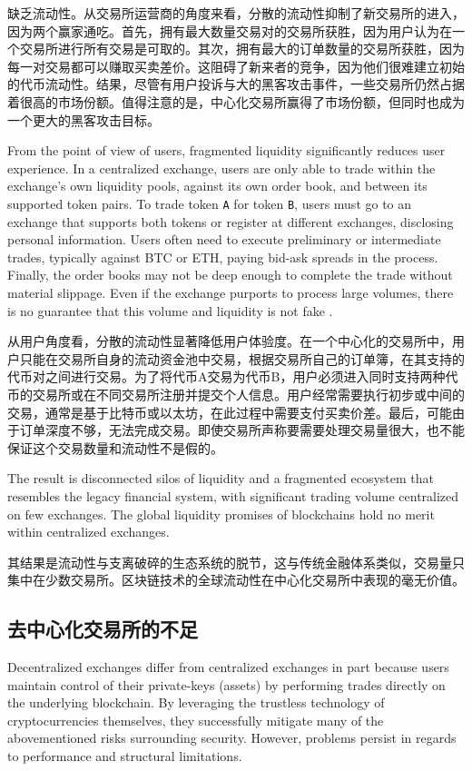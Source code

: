 \documentclass[UTF8,nofonts]{ctexart}
\begin{document}
\begin{multicols}{2}
缺乏流动性。从交易所运营商的角度来看，分散的流动性抑制了新交易所的进入，因为两个赢家通吃。首先，拥有最大数量交易对的交易所获胜，因为用户认为在一个交易所进行所有交易是可取的。其次，拥有最大的订单数量的交易所获胜，因为每一对交易都可以赚取买卖差价。这阻碍了新来者的竞争，因为他们很难建立初始的代币流动性。结果，尽管有用户投诉与大的黑客攻击事件，一些交易所仍然占据着很高的市场份额。值得注意的是，中心化交易所赢得了市场份额，但同时也成为一个更大的黑客攻击目标。


From the point of view of users, fragmented liquidity significantly reduces user experience. In a centralized exchange, users are only able to trade within the exchange's own liquidity pools, against its own order book, and between its supported token pairs. To trade token \verb|A| for token \verb|B|, users must go to an exchange that supports both tokens or register at different exchanges, disclosing personal information. Users often need to execute preliminary or intermediate trades, typically against BTC or ETH, paying bid-ask spreads in the process. Finally, the order books may not be deep enough to complete the trade without material slippage. Even if the exchange purports to process large volumes, there is no guarantee that this volume and liquidity is not fake .

从用户角度看，分散的流动性显著降低用户体验度。在一个中心化的交易所中，用户只能在交易所自身的流动资金池中交易，根据交易所自己的订单簿，在其支持的代币对之间进行交易。为了将代币A交易为代币B，用户必须进入同时支持两种代币的交易所或在不同交易所注册并提交个人信息。用户经常需要执行初步或中间的交易，通常是基于比特币或以太坊，在此过程中需要支付买卖价差。最后，可能由于订单深度不够，无法完成交易。即使交易所声称要需要处理交易量很大，也不能保证这个交易数量和流动性不是假的\cite{fakevolume}。


The result is disconnected silos of liquidity and a fragmented ecosystem that resembles the legacy financial system, with significant trading volume centralized on few exchanges. The global liquidity promises of blockchains hold no merit within centralized exchanges.

其结果是流动性与支离破碎的生态系统的脱节，这与传统金融体系类似，交易量只集中在少数交易所。区块链技术的全球流动性在中心化交易所中表现的毫无价值。

\subsection{去中心化交易所的不足}
Decentralized exchanges differ from centralized exchanges in part because users maintain control of their private-keys (assets) by performing trades directly on the underlying blockchain. By leveraging the trustless technology of cryptocurrencies themselves, they successfully mitigate many of the abovementioned risks surrounding security. However, problems persist in regards to performance and structural limitations. 


\end{multicols}
\end{document}
